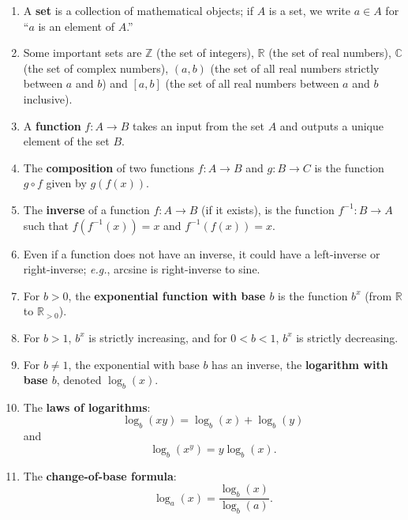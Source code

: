 \documentclass{article}
\begin{document}
\begin{enumerate}
	\item A \textbf{set} is a collection of mathematical objects; if $A$ is a set, we write $a\in A$ for ``$a$ is an element of $A$.''
	\item Some important sets are $\mathbb{Z}$ (the set of integers), $\mathbb{R}$ (the set of real numbers), $\mathbb{C}$ (the set of complex numbers), $(a,b)$ (the set of all real numbers strictly between $a$ and $b$) and $[a,b]$ (the set of all real numbers between $a$ and $b$ inclusive).
	\item A \textbf{function} $f:A\to B$ takes an input from the set $A$ and outputs a unique element of the set $B$.
	\item The \textbf{composition} of two functions $f:A\to B$ and $g:B\to C$ is the function $g\circ f$ given by $g(f(x))$.
	\item The \textbf{inverse} of a function $f:A\to B$ (if it exists), is the function $f^{-1}:B\to A$ such that $f(f^{-1}(x))=x$ and $f^{-1}(f(x))=x$.
	\item Even if a function does not have an inverse, it could have a left-inverse or right-inverse; \textit{e.g.}, arcsine is right-inverse to sine.
	\item For $b>0$, the \textbf{exponential function with base $b$} is the function $b^x$ (from $\mathbb{R}$ to $\mathbb{R}_{>0}$).
	\item For $b>1$, $b^x$ is strictly increasing, and for $0<b<1$, $b^x$ is strictly decreasing.
	\item For $b\neq 1$, the exponential with base $b$ has an inverse, the \textbf{logarithm with base $b$}, denoted $\log_b(x)$.
	\item The \textbf{laws of logarithms}:
		\[\log_b(xy)=\log_b(x)+\log_b(y)\]
		and
		\[\log_b(x^y)=y\log_b(x).\]
	\item The \textbf{change-of-base formula}:
		\[\log_a(x)=\frac{\log_b(x)}{\log_b(a)}.\]
\end{enumerate}
\end{document}
